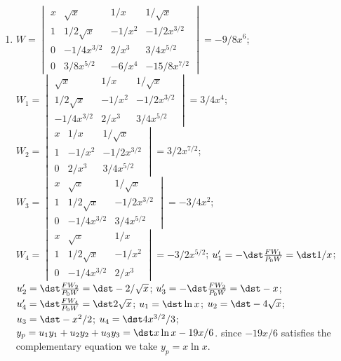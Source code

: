 \documentclass[openany]{book}
\newenvironment{sectionSolutions}{
 \begin{enumerate}[item-label={\thesection.\arabic{enumi}.}]
}{
 \end{enumerate}
}
\begin{document}
\begin{sectionSolutions}
\item
$W=\begin{vmatrix}
x&\sqrt{x}&1/x&1/\sqrt{x}\\
1&1/2\sqrt{x}&-1/x^2&-1/2x^{3/2}\\
0&-1/4x^{3/2}&2/x^3&3/4x^{5/2}\\
0&3/8x^{5/2}&-6/x^4&-15/8x^{7/2}
\end{vmatrix}=-9/8x^6$;
$W_1=\begin{vmatrix}
\sqrt{x}&1/x&1/\sqrt{x}\\
1/2\sqrt{x}&-1/x^2&-1/2x^{3/2}\\
-1/4x^{3/2}&2/x^3&3/4x^{5/2}\end{vmatrix}=3/4x^4$;
$W_2=\begin{vmatrix}
x&1/x&1/\sqrt{x}\\1&-1/x^2&-1/2x^{3/2}\\
0&2/x^3&3/4x^{5/2}\end{vmatrix}=3/2x^{7/2}$;
$W_3=\begin{vmatrix}
x&\sqrt{x}&1/\sqrt{x}\\
1&1/2\sqrt{x}&-1/2x^{3/2}\\0&-1/4x^{3/2}&3/4x^{5/2}
\end{vmatrix}=-3/4x^2$;
$W_4=\begin{vmatrix}
x&\sqrt{x}&1/x\\1&1/2\sqrt{x}&-1/x^2\\
0&-1/4x^{3/2}&2/x^3\end{vmatrix}=-3/2x^{5/2}$;
$u_1'=-\dst\frac{FW_1}{ P_0W}=\dst 1/x$;
$u_2'=\dst\frac{FW_2}{ P_0W}=\dst-2/\sqrt{x}$;
$u_3'=-\dst\frac{FW_2}{ P_0W}=\dst-x$;
$u_4'=\dst\frac{FW_4}{ P_0W}=\dst2\sqrt{x}$;
$u_1=\dst\ln x$;
$u_2=\dst-4\sqrt{x}$;
$u_3=\dst-x^2/2$;
$u_4=\dst4x^{3/2}/3$;
$y_p=u_1y_1+u_2y_2+u_3y_3=\dst x\ln x-19x/6$.
since $-19x/6$ satisfies the complementary equation we take
$y_p=x\ln x$.


\end{sectionSolutions}
\end{document}
